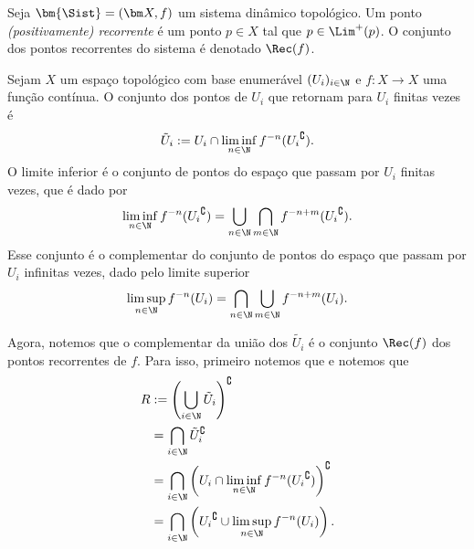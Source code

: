\begin{definition}
Seja $\bm{\Sist}=(\bm X,f)$ um sistema dinâmico topológico. Um ponto \emph{(positivamente) recorrente} é um ponto $p \in X$ tal que $p \in \Lim^+(p)$. O conjunto dos pontos recorrentes do sistema é denotado $\Rec(f)$.
\end{definition}

Sejam $X$ um espaço topológico com base enumerável $(U_i)_{i \in \N}$ e $f: X \to X$ uma função contínua. O conjunto dos pontos de $U_i$ que retornam para $U_i$ finitas vezes é
	\begin{equation*}
	\tilde U_i := U_i \cap \liminf_{n \in \N} f^{-n}({U_i}^\complement).
	\end{equation*}
O limite inferior é o conjunto de pontos do espaço que passam por $U_i$ finitas vezes, que é dado por
	\begin{equation*}
	\liminf_{n \in \N} f^{-n}({U_i}^\complement) = \bigcup_{n \in \N} \bigcap_{m \in \N} f^{-n+m}({U_i}^\complement).
	\end{equation*}
Esse conjunto é o complementar do conjunto de pontos do espaço que passam por $U_i$ infinitas vezes, dado pelo limite superior
	\begin{equation*}
	\limsup_{n \in \N} f^{-n}(U_i) = \bigcap_{n \in \N} \bigcup_{m \in \N} f^{-n+m}(U_i).
	\end{equation*}

Agora, notemos que o complementar da união dos $\tilde{U_i}$ é o conjunto $\Rec(f)$ dos pontos recorrentes de $f$. Para isso, primeiro notemos que
e notemos que
	\begin{align*}
	R &:= \left( \bigcup_{i \in \N} \tilde U_i \right)^\complement \\
		&= \bigcap_{i \in \N} {\tilde U_i}^\complement \\
		&= \bigcap_{i \in \N} \left( U_i \cap \liminf_{n \in \N} f^{-n}({U_i}^\complement) \right)^\complement \\
		&= \bigcap_{i \in \N} \left( {U_i}^\complement \cup \limsup_{n \in \N} f^{-n}(U_i) \right).
	\end{align*}

